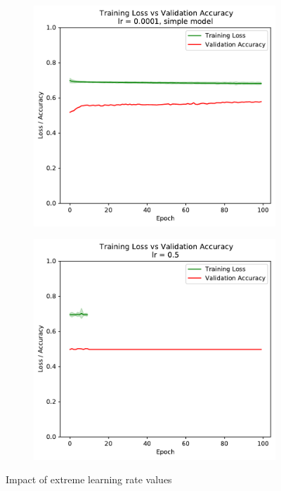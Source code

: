 \documentclass[sigconf,nonacm]{acmart}
\begin{document}
\begin{figure}[ht]
\begin{subfigure}[c]{0.45\columnwidth}
\includegraphics[width=\textwidth]{plot_simple_0_0001.pdf}
\end{subfigure}
\begin{subfigure}[c]{0.45\columnwidth}
\includegraphics[width=\textwidth]{plot_0_5.pdf}
\end{subfigure}
\caption{Impact of extreme learning rate values}
\label{part2:learning-rate}
\end{figure}
\end{document}
